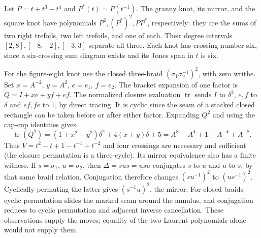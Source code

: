 Let $P=t+t^3-t^4$ and $P^*(t)=P(t^{-1})$. The granny knot, its mirror,
and the square knot have polynomials $P^2,(P^*)^2,PP^*$, respectively:
they are the sums of two right trefoils, two left trefoils, and one of
each. Their degree intervals $[2,8],[-8,-2],[-3,3]$ separate all three.
Each knot has crossing number six, since a six-crossing sum diagram
exists and its Jones span in $t$ is six.

For the figure-eight knot use the closed three-braid
$(\sigma_1\sigma_2^{-1})^2$, with zero writhe. Set
$x=A^{-2}$, $y=A^2$, $e=e_1$, $f=e_2$. The bracket expansion of one
factor is $Q=I+xe+yf+ef$. The normalized closure evaluation
$\operatorname{tr}$ sends $I$ to $\delta^2$, $e,f$ to $\delta$ and
$ef,fe$ to $1$, by direct tracing. It is cyclic since the seam of a
stacked closed rectangle can be taken before or after either factor.
Expanding $Q^2$ and using the cap-cup identities gives
\[
 \operatorname{tr}(Q^2)
  =(1+x^2+y^2)\delta^2+4(x+y)\delta+5
  =A^8-A^4+1-A^{-4}+A^{-8}.
\]
Thus $V=t^2-t+1-t^{-1}+t^{-2}$ and four crossings are necessary and
sufficient (the closure permutation is a three-cycle). Its mirror
equivalence also has a finite witness. If $s=\sigma_1$, $u=\sigma_2$,
then $\Delta=sus=usu$ conjugates $s$ to $u$ and $u$ to $s$, by that
same braid relation. Conjugation therefore changes $(su^{-1})^2$ to
$(us^{-1})^2$. Cyclically permuting the latter gives $(s^{-1}u)^2$,
the mirror. For closed braids cyclic permutation slides the marked seam
around the annulus, and conjugation reduces to cyclic permutation and
adjacent inverse cancellation. These observations supply the moves;
equality of the two Laurent polynomials alone would not supply them.

